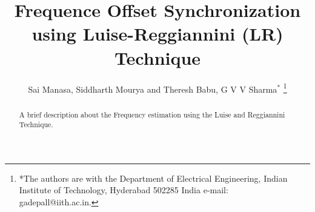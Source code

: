 \documentclass[journal,12pt,twocolumn]{IEEEtran}
\begin{document}

\makeatletter
{}
\makeatother

\let\StandardTheFigure\thefigure
\let\StandardTheTable\thetable





\def\putbox#1#2#3{\makebox[0in][l]{\makebox[#1][l]{}\raisebox{\baselineskip}[0in][0in]{\raisebox{#2}[0in][0in]{#3}}}}
     \def\rightbox#1{\makebox[0in][r]{#1}}
     \def\centbox#1{\makebox[0in]{#1}}
     \def\topbox#1{\raisebox{-\baselineskip}[0in][0in]{#1}}
     \def\midbox#1{\raisebox{-0.5\baselineskip}[0in][0in]{#1}}



\title{ 
Frequence Offset Synchronization using Luise-Reggiannini (LR) Technique
}



\author{Sai Manasa, Siddharth Mourya and Theresh Babu, G V V Sharma$^{*}$%
\thanks{*The authors are with the Department
of Electrical Engineering, Indian Institute of Technology, Hyderabad
502285 India e-mail:  gadepall@iith.ac.in.}
}


\maketitle

\tableofcontents

%
\begin{abstract}
\boldmath
A brief description about the Frequency estimation using the Luise and Reggiannini Technique.
\end{abstract}

%
\end{document}
